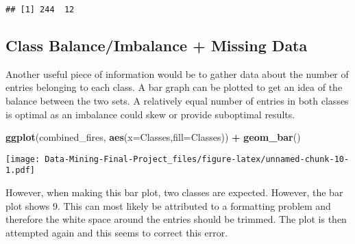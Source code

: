 \documentclass[
]{article}
\newenvironment{Shaded}{\begin{snugshade}}{\end{snugshade}}
\newcommand{\AttributeTok}[1]{\textcolor[rgb]{0.13,0.29,0.53}{#1}}
\newcommand{\FunctionTok}[1]{\textcolor[rgb]{0.13,0.29,0.53}{\textbf{#1}}}
\newcommand{\NormalTok}[1]{#1}
\newcommand{\OtherTok}[1]{\textcolor[rgb]{0.56,0.35,0.01}{#1}}
\newcommand{\SpecialCharTok}[1]{\textcolor[rgb]{0.81,0.36,0.00}{\textbf{#1}}}
\newcommand{\StringTok}[1]{\textcolor[rgb]{0.31,0.60,0.02}{#1}}
\begin{document}
\begin{verbatim}
## [1] 244  12
\end{verbatim}

\subsection{Class Balance/Imbalance + Missing
Data}\label{class-balanceimbalance-missing-data}

Another useful piece of information would be to gather data about the
number of entries belonging to each class. A bar graph can be plotted to
get an idea of the balance between the two sets. A relatively equal
number of entries in both classes is optimal as an imbalance could skew
or provide suboptimal results.

\begin{Shaded}
\begin{Highlighting}[]
\FunctionTok{ggplot}\NormalTok{(combined\_fires, }\FunctionTok{aes}\NormalTok{(}\AttributeTok{x=}\NormalTok{Classes,}\AttributeTok{fill=}\NormalTok{Classes)) }\SpecialCharTok{+} 
  \FunctionTok{geom\_bar}\NormalTok{()}
\end{Highlighting}
\end{Shaded}

\texttt{[image: Data-Mining-Final-Project\_files/figure-latex/unnamed-chunk-10-1.pdf]}

However, when making this bar plot, two classes are expected. However,
the bar plot shows 9. This can most likely be attributed to a formatting
problem and therefore the white space around the entries should be
trimmed. The plot is then attempted again and this seems to correct this
error.

\begin{Shaded}
\end{Shaded}
\end{document}

